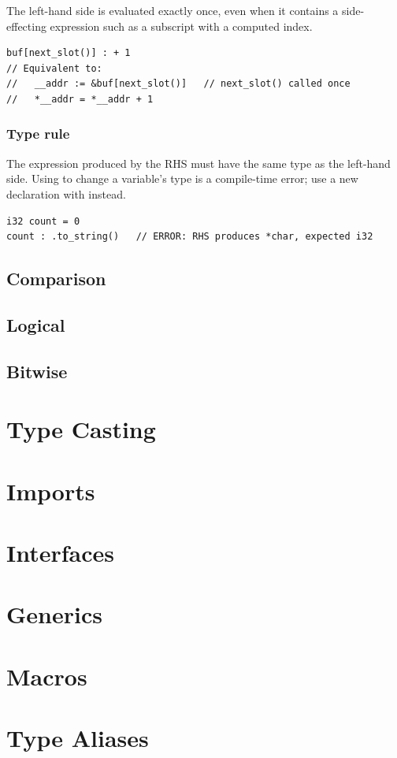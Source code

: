 The left-hand side is evaluated exactly once, even when it contains a
side-effecting expression such as a subscript with a computed index.

\begin{lstlisting}[style=zinc, caption={Left-hand side evaluated once}]
buf[next_slot()] : + 1
// Equivalent to:
//   __addr := &buf[next_slot()]   // next_slot() called once
//   *__addr = *__addr + 1
\end{lstlisting}

\subsubsection*{Type rule}

The expression produced by the RHS must have the same type as the
left-hand side. Using \zn{:} to change a variable's type is a compile-time
error; use a new declaration with \zn{:=} instead.

\begin{lstlisting}[style=zinc, caption={Type mismatch is a compile error}]
i32 count = 0
count : .to_string()   // ERROR: RHS produces *char, expected i32
\end{lstlisting}

\subsection{Comparison}

\subsection{Logical}

\subsection{Bitwise}

\section{Type Casting}

\section{Imports}

\section{Interfaces}

\section{Generics}

\section{Macros}

\section{Type Aliases}
